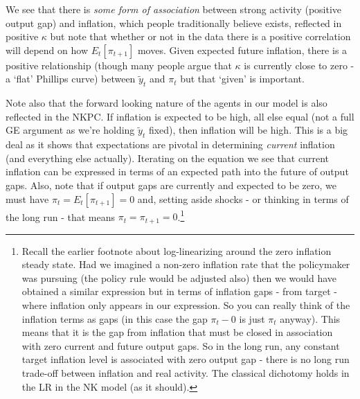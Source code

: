 \documentclass[authoryear,11pt]{elsarticle}
\begin{document}
We see that there is \textit{some form of association} between strong activity (positive output gap) and inflation, which people traditionally believe exists, reflected in positive $\kappa$ but note that whether or not in the data there is a positive correlation will depend on how $E_{t}[\pi_{t+1}]$ moves. Given expected future inflation, there is a positive relationship (though many people argue that $\kappa$ is currently close to zero - a `flat' Phillips curve) between $\tilde{y}_{t}$ and $\pi_{t}$ but that `given' is important.

Note also that the forward looking nature of the agents in our model is also reflected in the NKPC. If inflation is expected to be high, all else equal (not a full GE argument as we're holding $\tilde{y}_{t}$ fixed), then inflation will be high. This is a big deal as it shows that expectations are pivotal in determining \textit{current} inflation (and everything else actually). Iterating on the equation we see that current inflation can be expressed in terms of an expected path into the future of output gaps. Also, note that if output gaps are currently and expected to be zero, we must have $\pi_{t}=E_{t}[\pi_{t+1}]=0$ and, setting aside shocks - or thinking in terms of the long run - that means $\pi_{t}=\pi_{t+1}=0$.\footnote{Recall the earlier footnote about log-linearizing around the zero inflation steady state. Had we imagined a non-zero inflation rate that the policymaker was pursuing (the policy rule would be adjusted also) then we would have obtained a similar expression but in terms of inflation gaps - from target - where inflation only appears in our expression. So you can really think of the inflation terms as gaps (in this case the gap $\pi_{t}-0$ is just $\pi_{t}$ anyway). This means that it is the gap from inflation that must be closed in association with zero current and future output gaps. So in the long run, any constant target inflation level is associated with zero output gap - there is no long run trade-off between inflation and real activity. The classical dichotomy holds in the LR in the NK model (as it should).}
	
\end{document}

